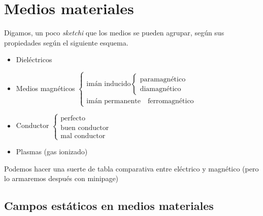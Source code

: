 \documentclass[10pt,oneside]{CBFT_book}
\begin{document}
\chapter{Medios materiales}


Digamos, un poco {\it sketchi} que los medios se pueden agrupar, según sus propiedades
según el siguiente esquema.

\begin{itemize}
 \item Dieléctricos
 \item Medios magnéticos
	$\begin{cases}
	 \text{imán inducido}
		\begin{cases}
		\text{paramagnético} \\
		\text{diamagnético}
		\end{cases} \\
	 \text{imán permanente} \quad \text{ferromagnético}
	\end{cases}$
 \item Conductor
	$\begin{cases}
	 \text{perfecto} \\
	 \text{buen conductor} \\
	 \text{mal conductor}
	\end{cases}$
\item Plasmas (gas ionizado)
\end{itemize}

Podemos hacer una suerte de tabla comparativa entre eléctrico y magnético
(pero lo armaremos después con minipage)

\section{Campos estáticos en medios materiales}

\end{document}
